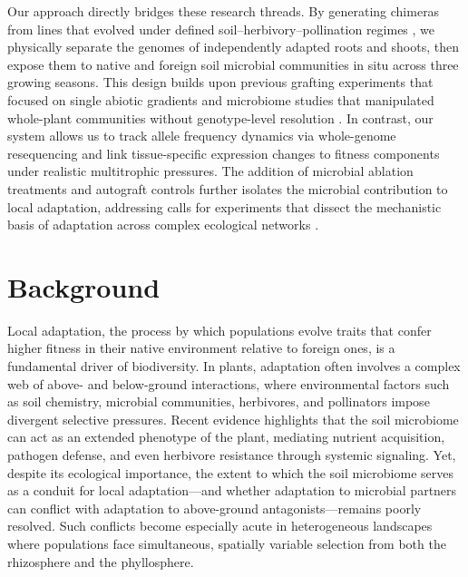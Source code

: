 \documentclass{article}
\begin{document}
Our approach directly bridges these research threads. By generating chimeras from lines that evolved under defined soil–herbivory–pollination regimes \cite{Johnson2021}, we physically separate the genomes of independently adapted roots and shoots, then expose them to native and foreign soil microbial communities in situ across three growing seasons. This design builds upon previous grafting experiments that focused on single abiotic gradients \cite{Gienapp2017} and microbiome studies that manipulated whole-plant communities without genotype-level resolution \cite{Vandenkoornhuyse2015}. In contrast, our system allows us to track allele frequency dynamics via whole-genome resequencing and link tissue-specific expression changes to fitness components under realistic multitrophic pressures. The addition of microbial ablation treatments and autograft controls further isolates the microbial contribution to local adaptation, addressing calls for experiments that dissect the mechanistic basis of adaptation across complex ecological networks \cite{Richards2010,Wade2016}.

\section{Background}

Local adaptation, the process by which populations evolve traits that confer higher fitness in their native environment relative to foreign ones, is a fundamental driver of biodiversity. In plants, adaptation often involves a complex web of above- and below-ground interactions, where environmental factors such as soil chemistry, microbial communities, herbivores, and pollinators impose divergent selective pressures. Recent evidence highlights that the soil microbiome can act as an extended phenotype of the plant, mediating nutrient acquisition, pathogen defense, and even herbivore resistance through systemic signaling. Yet, despite its ecological importance, the extent to which the soil microbiome serves as a conduit for local adaptation—and whether adaptation to microbial partners can conflict with adaptation to above-ground antagonists—remains poorly resolved. Such conflicts become especially acute in heterogeneous landscapes where populations face simultaneous, spatially variable selection from both the rhizosphere and the phyllosphere.
\end{document}
